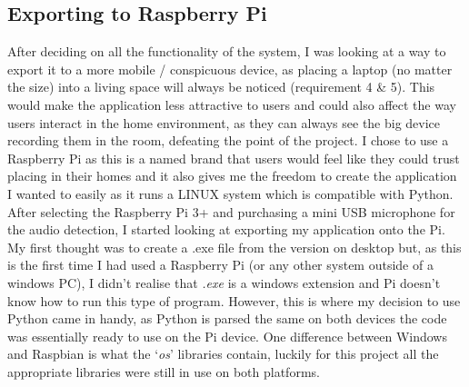 \documentclass[a4paper,11pt]{report}
\begin{document}
\subsection{Exporting to Raspberry Pi}
After deciding on all the functionality of the system, I was looking at a way to export it to a more mobile / conspicuous device, as placing a laptop (no matter the size) into a living space will always be noticed (requirement 4 \& 5). This would make the application less attractive to users and could also affect the way users interact in the home environment, as they can always see the big device recording them in the room, defeating the point of the project. I chose to use a Raspberry Pi as this is a named brand that users would feel like they could trust placing in their homes and it also gives me the freedom to create the application I wanted to easily as it runs a LINUX system which is compatible with Python.\\

After selecting the Raspberry Pi 3+ and purchasing a mini USB microphone for the audio detection, I started looking at exporting my application onto the Pi. My first thought was to create a .exe file from the version on desktop but, as this is the first time I had used a Raspberry Pi (or any other system outside of a windows PC), I didn’t realise that \textit{.exe} is a windows extension and Pi doesn’t know how to run this type of program. However, this is where my decision to use Python came in handy, as Python is parsed the same on both devices the code was essentially ready to use on the Pi device. One difference between Windows and Raspbian is what the ‘\textit{os}’ libraries contain, luckily for this project all the appropriate libraries were still in use on both platforms.
\end{document}
